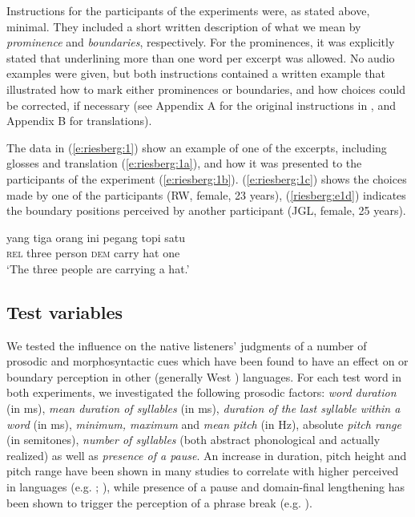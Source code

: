 \documentclass[output=paper
,modfonts
,nonflat]{langsci/langscibook}
\begin{document}
Instructions for the participants of the experiments were, as stated above, minimal. They included a short written description of what we mean by \textit{prominence} and \textit{boundaries}, respectively. For the prominences, it was explicitly stated that underlining more than one word per excerpt was allowed. No audio examples were given, but both instructions contained a written example that illustrated how to mark either prominences or boundaries, and how choices could be corrected, if necessary (see Appendix A for the original instructions in , and Appendix B for  translations).

The data in (\ref{e:riesberg:1}) show an example of one of the excerpts, including glosses and translation (\ref{e:riesberg:1a}), and how it was presented to the participants of the experiment (\ref{e:riesberg:1b}). (\ref{e:riesberg:1c}) shows the  choices made by one of the participants (RW, female, 23 years), (\ref{riesberg:e1d}) indicates the boundary positions perceived by another participant (JGL, female, 25 years).

\begin{exe}
	\label{e:riesberg:1}
	\begin{xlist}
		\ex\label{e:riesberg:1a}
		\gll  yang tiga orang ini pegang topi satu\\
		\textsc{rel} three person \textsc{dem} carry hat one\\
		\glt ‘The three people are carrying a hat.’
		\label{e:riesberg:1b}
		\label{e:riesberg:1c}
		\label{riesberg:e1d}
	\end{xlist}
\end{exe}

\subsection{{{Test variables}}}

We tested the influence on the native listeners’ judgments of a number of prosodic and morphosyntactic cues which have been found to have an effect on  or boundary perception in other (generally West ) languages. For each test word in both experiments, we investigated the following prosodic factors: \textit{word duration} (in ms), \textit{mean duration of syllables} (in ms), \textit{duration of the last syllable within a word} (in ms), \textit{minimum, maximum} and \textit{mean pitch} (in Hz), absolute \textit{pitch range} (in semitones), \textit{number of syllables} (both abstract phonological and actually realized) as well as \textit{presence of a pause}. An increase in duration, pitch height and pitch range have been shown in many studies to correlate with higher perceived  in  languages (e.g. \citealt{Cole2010a}; \citealt{Rietveld1985}), while presence of a pause and domain-final lengthening has been shown to trigger the perception of a phrase break (e.g. \citealt{Turk2007}).
\end{document}
